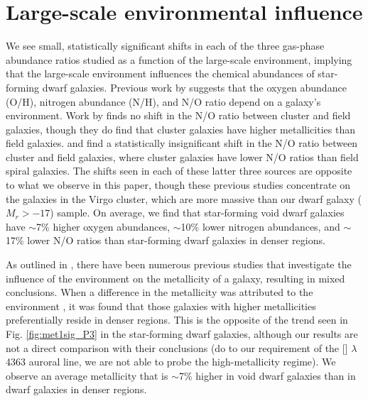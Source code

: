 %
%
\section[Environmental influence]{Large-scale environmental influence}

We see small, statistically significant shifts in each of the three gas-phase 
abundance ratios studied as a function of the large-scale environment, implying 
that the large-scale environment influences the chemical abundances of 
star-forming dwarf galaxies.  Previous work by \cite{Douglass17b} suggests that 
the oxygen abundance (O/H), nitrogen abundance (N/H), and N/O ratio depend on a 
galaxy's environment.  Work by \cite{Shields91} finds no shift in the N/O ratio 
between cluster and field galaxies, though they do find that cluster galaxies 
have higher metallicities than field galaxies.  \cite{Contini02} and 
\cite{Pilyugin02} find a statistically insignificant shift in the N/O ratio 
between cluster and field galaxies, where cluster galaxies have lower N/O ratios 
than field spiral galaxies.  The shifts seen in each of these latter three 
sources are opposite to what we observe in this paper, though these previous 
studies concentrate on the galaxies in the Virgo cluster, which are more massive 
than our dwarf galaxy ($M_r > -17$) sample.  On average, we find that 
star-forming void dwarf galaxies have $\sim$7\% higher oxygen abundances, 
$\sim$10\% lower nitrogen abundances, and $\sim$17\% lower N/O ratios than 
star-forming dwarf galaxies in denser regions.

As outlined in \cite{Douglass17a}, there have been numerous previous studies 
that investigate the influence of the environment on the metallicity of a 
galaxy, resulting in mixed conclusions.  When a difference in the metallicity 
was attributed to the environment \citep[as in][for example]{Pustilnik06,
Pustilnik11b,Pustilnik14,SanchezAlmeida16,Cooper08}, it was found that those 
galaxies with higher metallicities preferentially reside in denser regions.  
This is the opposite of the trend seen in Fig. \ref{fig:met1sig_P3} in the 
star-forming dwarf galaxies, although our results are not a direct comparison 
with their conclusions (do to our requirement of the [] $\lambda$4363 
auroral line, we are not able to probe the high-metallicity regime).  We observe 
an average metallicity that is $\sim$7\% higher in void dwarf galaxies than in 
dwarf galaxies in denser regions.


